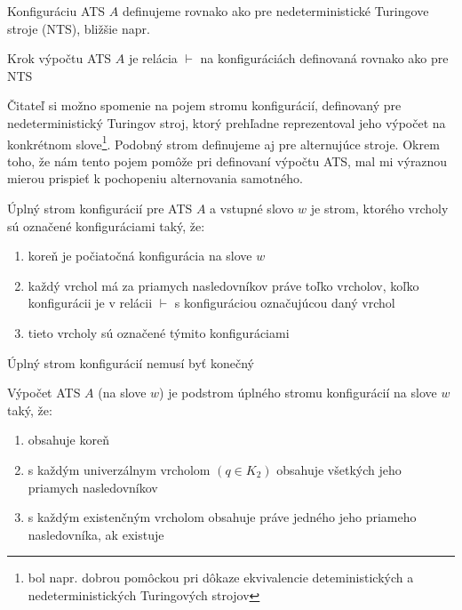 \begin{definicia}
Konfiguráciu ATS $A$ definujeme rovnako ako pre nedeterministické
Turingove stroje (NTS), bližšie napr. \cite{Hopc}
\end{definicia}

\begin{definicia}
Krok výpočtu ATS $A$ je relácia $\vdash$ na konfiguráciách
definovaná rovnako ako pre NTS
\end{definicia}

Čitateľ si možno spomenie na pojem stromu konfigurácií, definovaný
pre nedeterministický Turingov stroj, ktorý prehľadne
reprezentoval jeho výpočet na konkrétnom slove\footnote{bol napr.
dobrou pomôckou pri dôkaze ekvivalencie deteministických a
nedeterministických Turingových strojov}. Podobný strom definujeme
aj pre alternujúce stroje. Okrem toho, že nám tento pojem pomôže
pri definovaní výpočtu ATS, mal mi výraznou mierou prispieť k
pochopeniu alternovania samotného.

\begin{definicia}
Úplný strom konfigurácií pre ATS $A$ a vstupné slovo $w$ je strom,
ktorého vrcholy sú označené konfiguráciami taký, že:
\begin{enumerate}
\item koreň je počiatočná konfigurácia na slove $w$
\item každý vrchol má za priamych nasledovníkov práve toľko
vrcholov, koľko konfigurácii je v relácii $\vdash$ s konfiguráciou
označujúcou daný vrchol
\item tieto vrcholy sú označené týmito konfiguráciami
\end{enumerate}
\end{definicia}

\begin{poznamka}
Úplný strom konfigurácií nemusí byť konečný
\end{poznamka}

\begin{definicia}
Výpočet ATS $A$ (na slove $w$) je podstrom úplného stromu
konfigurácií na slove $w$ taký, že:
\begin{enumerate}
\item obsahuje koreň
\item s každým univerzálnym vrcholom $(q\in K_2)$ obsahuje
všetkých jeho priamych nasledovníkov
\item s každým existenčným vrcholom obsahuje práve jedného jeho
priameho nasledovníka, ak existuje
\end{enumerate}
\end{definicia}

